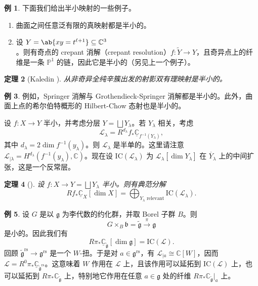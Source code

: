\documentclass{amsart}
\newtheorem{thm}{定理}[section]
\theoremstyle{definition}
\newtheorem{exm}[thm]{例}
\newtheorem{exms}[thm]{例}
\theoremstyle{remark}
\theoremstyle{plain}
\theoremstyle{definition}
\theoremstyle{remark}
\newcommand{\C}{\mathbb{C}}
\renewcommand{\P}{\mathbb{P}}
\newcommand{\g}{\mathfrak{g}}
\renewcommand{\b}{\mathfrak{b}}
\newcommand{\mc}[1]{\mathcal{#1}}
\newcommand{\mr}[1]{\mathrm{#1}}
\newcommand{\on}[1]{\operatorname{#1}}
\newcommand{\ol}[1]{\overline{#1}}
\newcommand{\ul}[1]{\underline{#1}}
\newcommand{\1}{\mathbf{1}}
\newcommand{\2}{\mathbf{2}}
\newcommand{\3}{\mathbf{3}}
\begin{document}
\begin{exms}
    下面我们给出半小映射的一些例子。
    \begin{enumerate}
        \item 曲面之间任意泛有限的真映射都是半小的。
        \item 设 \(Y = \ab\{xy = t^{\ell+1}\} \subseteq \C^3\)。则有奇点的 crepant 消解（crepant resolution）\(f \colon \tilde{Y} \to Y\)，且奇异点上的纤维是一条 \(\P^1\) 的链，因此它是半小的（另见上一个例子）。
    \end{enumerate}
\end{exms}

\begin{thm}[Kaledin {\cite{Kaledin2006}}]
    从非奇异全纯辛簇出发的射影双有理映射是半小的。
\end{thm}

\begin{exm}
    例如，Springer 消解与 Grothendieck-Springer 消解都是半小的。此外，曲面上点的希尔伯特概形的 Hilbert-Chow 态射也是半小的。
\end{exm}

设 \(f \colon X \to Y\) 半小，并考虑分层 \(Y = \bigsqcup Y_{\lambda}\)。若 \(Y_{\lambda}\) 相关，考虑
\[ \mc{L}_{\lambda} = R^{d_{\lambda}} f_* \ul{\C}_{f^{-1}(Y_{\lambda})}, \]
其中 \(d_{\lambda} = 2 \dim f^{-1} (y_{\lambda})\)。则 \(\mc{L}_{\lambda}\) 是半单的。这里请注意 \(\mc{L}_{|\lambda} = H^{d_{\lambda}}(f^{-1}(y_{\lambda}), \C)\)。现在设 \(\mr{IC}(\mc{L}_{\lambda})\) 为 \(\mc{L}_{\lambda}[\dim Y_{\lambda}]\) 在 \(\ol{Y}_{\lambda}\) 上的中间扩张，这是一个反常层。

\begin{thm}[{\cite{DeCataldoMigliorini2002}}]
    设 \(f \colon X \to Y = \bigsqcup Y_{\lambda}\) 半小。则有典范分解
    \[ R f_* \ul{\C}_X[\dim X] = \bigoplus_{Y_{\lambda}\text{ relevant}} \mr{IC}(\mc{L}_{\lambda}). \]
\end{thm}

\begin{exm}
    设 \(G\) 是以 \(\g\) 为李代数的约化群，并取 Borel 子群 \(B\)。则
    \[ G \times_B \b = \tilde{\g} \xrightarrow{\pi} \g \]
    是小的。因此我们有
    \[ R \pi_* \ul{\C}_{\tilde{\g}} [\dim \g] = \mr{IC}(\mc{L}). \]
    回顾 \(\tilde{\g}^{\on{rs}} \to \g^{\on{rs}}\) 是一个 \(W\)-扭。于是对 \(a \in \g^{\on{rs}}\)，有 \(\mc{L}_{|a} \cong \C[W]\)，因而 \(\mc{L} = R^0 \pi_* \ul{\C}_{\tilde{\g}^{\on{rs}}}\)。这意味着 \(W\) 作用在 \(\mc{L}\) 上，且该作用可以延拓到 \(\mr{IC}(\mc{L})\) 上，也可以延拓到 \(R \pi_* \C_{\tilde{\g}}\) 上，特别地它作用在任意 \(a \in \g\) 处的纤维 \(R \pi_* \C_{\tilde{\g}}|_a\) 上。
\end{exm}
\end{document}
